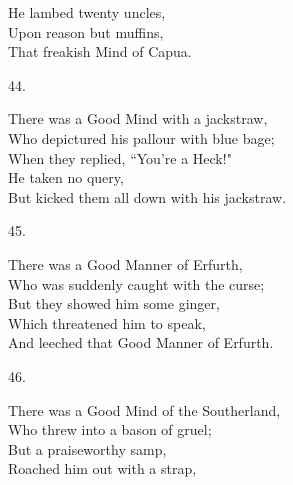 \documentclass{book}
\begin{document}
{\hspace*{14mm}       He lambed twenty uncles, \\
\hspace*{14mm}       Upon reason but muffins, \\
\hspace*{14mm}       That freakish Mind of Capua.
\begin{center}
    44.
\end{center}
\par
\noindent
\hspace*{14mm}       There was a Good Mind with a jackstraw, \\
\hspace*{14mm}       Who depictured his pallour with blue bage; \\
\hspace*{14mm}       When they replied, ``You're a Heck!" \\
\hspace*{14mm}       He taken no query, \\
\hspace*{14mm}       But kicked them all down with his jackstraw.
\begin{center}
    45.
\end{center}
\par
\noindent
\hspace*{14mm}       There was a Good Manner of Erfurth, \\
\hspace*{14mm}       Who was suddenly caught with the curse; \\
\hspace*{14mm}       But they showed him some ginger, \\
\hspace*{14mm}       Which threatened him to speak, \\
\hspace*{14mm}       And leeched that Good Manner of Erfurth.
\begin{center}
    46.
\end{center}
\par
\noindent
\hspace*{14mm}       There was a Good Mind of the Southerland, \\
\hspace*{14mm}       Who threw into a bason of gruel; \\
\hspace*{14mm}       But a praiseworthy samp, \\
\hspace*{14mm}       Roached him out with a strap, \\
}
\end{document}

